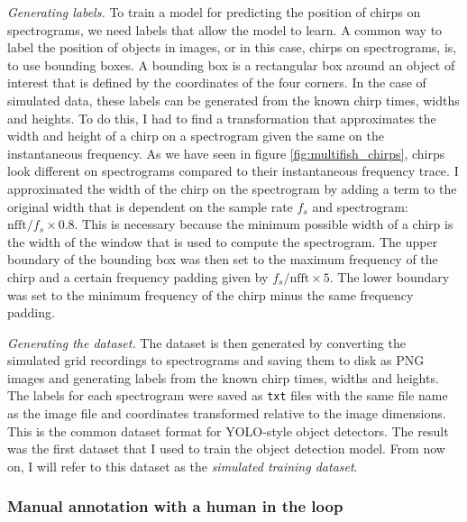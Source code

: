 \emph{Generating labels.} To train a model for predicting the position of
chirps on spectrograms, we need labels that allow the model to learn. A common
way to label the position of objects in images, or in this case, chirps on
spectrograms, is, to use bounding boxes. A bounding box is a rectangular box
around an object of interest that is defined by the coordinates of the four
corners. In the case of simulated data, these labels can be generated from the
known chirp times, widths and heights. To do this, I had to find a
transformation that approximates the width and height of a chirp on a
spectrogram given the same on the instantaneous frequency. As we have seen in
figure \ref{fig:multifish_chirps}, chirps look different on spectrograms
compared to their instantaneous frequency trace. I approximated the width of
the chirp on the spectrogram by adding a term to the original width that is
dependent on the sample rate $f_s$ and spectrogram: $\text{nfft} / f_{s} \times
0.8$. This is necessary because the minimum possible width of a chirp is the
width of the window that is used to compute the spectrogram. The upper boundary
of the bounding box was then set to the maximum frequency of the chirp and a
certain frequency padding given by $f_{s}/\text{nfft}\times5$. The lower
boundary was set to the minimum frequency of the chirp minus the same frequency
padding.

\emph{Generating the dataset.} The dataset is then generated by converting the
simulated grid recordings to spectrograms and saving them to disk as PNG images
and generating labels from the known chirp times, widths and heights. The
labels for each spectrogram were saved as \texttt{txt} files with the same
file name as the image file and coordinates transformed relative to the image
dimensions. This is the common dataset format for YOLO-style object detectors.
The result was the first dataset that I used to train the object detection
model. From now on, I will refer to this dataset as the \emph{simulated
training dataset}.

\subsubsection{Manual annotation with a human in the loop}

